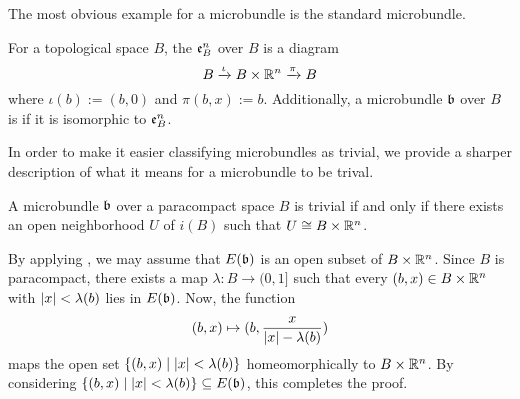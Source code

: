 \begin{myparagraph}
    The most obvious example for a microbundle is the standard microbundle.
\end{myparagraph}

\begin{myexample}
    For a topological space $B$, the  $\mathfrak{e}^n_B$ over $B$ is a diagram
    \[ B \xrightarrow{\iota} B \times \mathbb{R}^n \xrightarrow{\pi} B{} \]
    where $\iota(b) := (b, 0)$ and $\pi(b, x) := b$.
    Additionally, a microbundle $\mathfrak{b}$ over $B$ is  if it is isomorphic to $\mathfrak{e}^n_B$.
\end{myexample}

\begin{myparagraph}
    In order to make it easier classifying microbundles as trivial,
    we provide a sharper description of what it means for a microbundle to be trival. 
\end{myparagraph}

\begin{mylemma}
    A microbundle $\mathfrak{b}$ over a paracompact space $B$ is trivial if and only if there exists an open neighborhood $U$ of $i(B)$ such that $U \cong B \times \mathbb{R}^n$.
\end{mylemma}
\begin{myproof}
    By applying , we may assume that $E(\mathfrak{b})$ is an open subset of $B \times \mathbb{R}^n$.
    Since $B$ is paracompact, there exists a map $\lambda: B \to (0, 1]$ such that every $(b, x) \in B \times \mathbb{R}^n$ with $\vert{} x \vert{} < \lambda(b)$ lies in $E(\mathfrak{b})$.
    Now, the function
    \[ (b, x) \mapsto (b, \frac{x}{\vert{} x \vert{} - \lambda(b)}) \]
    maps the open set $\{(b, x) \mid \vert{} x \vert{} < \lambda(b)\}$ homeomorphically to $B \times \mathbb{R}^n$.
    By considering $\{(b, x) \mid \vert{} x \vert{} < \lambda(b)\} \subseteq{} E(\mathfrak{b})$, this completes the proof.
\end{myproof}